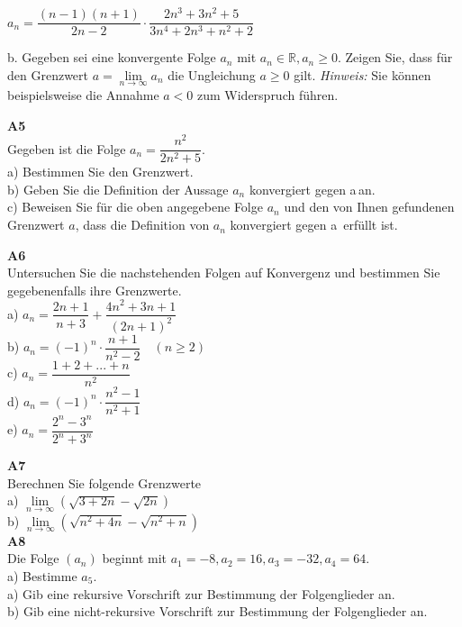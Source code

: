 \documentclass[landscape,twocolumn,a4paper]{article}
\begin{document}
$a_n = \dfrac{(n-1)(n+1)}{2n-2} \cdot \dfrac{2n^3+3n^2+5}{3n^4+2n^3+n^2+2}$ 

b. Gegeben sei eine konvergente Folge $a_n$ mit $a_n \in \mathbb{R}, a_n \ge 0$. Zeigen Sie, dass
für den Grenzwert $a = \lim \limits_{n \to \infty} a_n$ die Ungleichung $a \ge 0$ gilt. \textit{Hinweis:} Sie
können beispielsweise die Annahme $a < 0$ zum Widerspruch führen.
\bigskip

\textbf{A5} \\
Gegeben ist die Folge $a_n = \dfrac{n^2}{2n^2+5}$. \\
a) Bestimmen Sie den Grenzwert. \\
b) Geben Sie die Definition der Aussage \glqq $a_n$ konvergiert gegen a\grqq\,an. \\
c) Beweisen Sie für die oben angegebene Folge $a_n$ und den von Ihnen gefundenen Grenzwert $a$, dass die
Definition von \glqq $a_n$ konvergiert gegen a\grqq\ erfüllt ist.\\
\bigskip

\textbf{A6} \\
Untersuchen Sie die nachstehenden Folgen auf Konvergenz und bestimmen Sie gegebenenfalls ihre Grenzwerte. \\
a) $a_n = \dfrac{2n+1}{n+3} + \dfrac{4n^2+3n+1}{(2n+1)^2} $\\
b) $a_n = (-1)^n \cdot \dfrac{n+1}{n^2-2} \quad (n \ge 2)$ \\
c) $a_n = \dfrac{1+2+...+n}{n^2} $ \\
d) $a_n = (-1)^n \cdot \dfrac{n^2-1}{n^2+1}$ \\
e) $a_n = \dfrac{2^n-3^n}{2^n+3^n}$

\textbf{A7} \\
Berechnen Sie folgende Grenzwerte \\
a) $\lim \limits_{n \to \infty} (\sqrt{3+2n}-\sqrt{2n})$ \\
b) $\lim \limits_{n \to \infty} (\sqrt{n^2+4n}-\sqrt{n^2+n})$ \\

\textbf{A8} \\
Die Folge $(a_n)$ beginnt mit $a_1 = -8, a_2 = 16, a_3 = -32, a_4 = 64$. \\
a) Bestimme $a_5$. \\
a) Gib eine rekursive Vorschrift zur Bestimmung der Folgenglieder an. \\
b) Gib eine nicht-rekursive Vorschrift zur Bestimmung der Folgenglieder an. 


 
\end{document}
